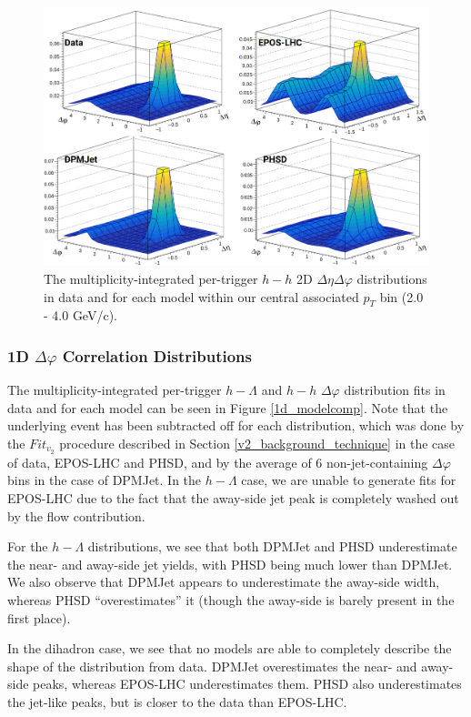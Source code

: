 \documentclass[ALICE,manyauthors]{ALICE_analysis_notes}
\begin{document}
\begin{figure}[ht]
\centering
\includegraphics[width=5in]{figures/h_h_2d_modelcomp.png}
\caption{The multiplicity-integrated per-trigger $h-h$ 2D $\Delta\eta\Delta\varphi$ distributions in data and for each model within our central associated $p_{T}$ bin (2.0 - 4.0 GeV/c).}
\label{h_h_2d_model}
\end{figure}
\clearpage

\subsubsection{1D $\Delta\varphi$ Correlation Distributions}
\label{model_1d_correlations}

The multiplicity-integrated per-trigger $h-\Lambda$ and $h-h$ $\Delta\varphi$ distribution fits in data and for each model can be seen in Figure \ref{1d_modelcomp}. Note that the underlying event has been subtracted off for each distribution, which was done by the $Fit_{v_{2}}$ procedure described in Section \ref{v2_background_technique} in the case of data, EPOS-LHC and PHSD, and by the average of 6 non-jet-containing $\Delta\varphi$ bins in the case of DPMJet. In the $h-\Lambda$ case, we are unable to generate fits for EPOS-LHC due to the fact that the away-side jet peak is completely washed out by the flow contribution.

For the $h-\Lambda$ distributions, we see that both DPMJet and PHSD underestimate the near- and away-side jet yields, with PHSD being much lower than DPMJet. We also observe that DPMJet appears to underestimate the away-side width, whereas PHSD ``overestimates'' it (though the away-side is barely present in the first place).

In the dihadron case, we see that no models are able to completely describe the shape of the distribution from data. DPMJet overestimates the near- and away-side peaks, whereas EPOS-LHC underestimates them. PHSD also underestimates the jet-like peaks, but is closer to the data than EPOS-LHC.
\end{document}
